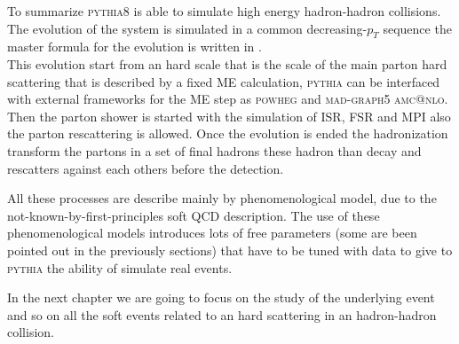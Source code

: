 To summarize \textsc{pythia8} is able to simulate high energy hadron-hadron collisions. The evolution of the system is simulated in a common decreasing-$p_T$ sequence the master formula for the evolution is written in . 
\\
This evolution start from an hard scale that is the scale of the main parton hard scattering that is described by a fixed ME calculation, \textsc{pythia} can be interfaced with external frameworks for the ME step as \textsc{powheg} and \textsc{mad-graph5 amc@nlo}. Then the parton shower is started with the simulation of ISR, FSR and MPI also the parton rescattering is allowed. Once the evolution is ended the hadronization transform the partons in a set of final hadrons these hadron than decay and rescatters against each others before the detection.

All these processes are describe mainly by phenomenological model, due to the not-known-by-first-principles soft QCD description. The use of these phenomenological models introduces lots of free parameters (some are been pointed out in the previously sections) that have to be tuned with data to give to \textsc{pythia} the ability of simulate real events.

In the next chapter we are going to focus on the study of the underlying event and so on all the soft events related to an hard scattering in an hadron-hadron collision. 

